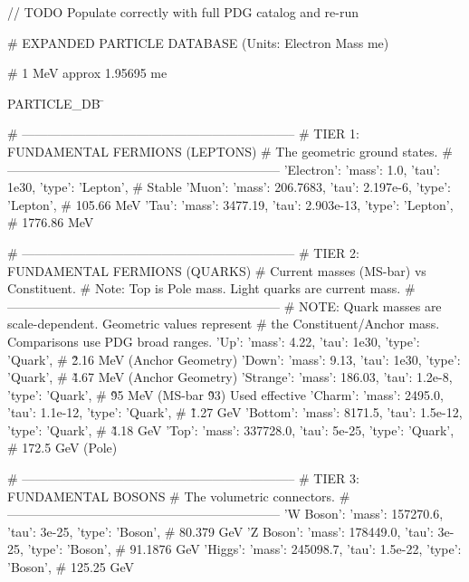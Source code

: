 // TODO Populate correctly with full PDG catalog and re-run

\# EXPANDED PARTICLE DATABASE (Units: Electron Mass me)

\# 1 MeV approx 1.95695 me

PARTICLE\_DB \= {  
    \# \------------------------------------------------------------------  
    \# TIER 1: FUNDAMENTAL FERMIONS (LEPTONS)  
    \# The geometric ground states.  
    \# \------------------------------------------------------------------  
    'Electron':    {'mass': 1.0,           'tau': 1e30,      'type': 'Lepton'},    \# Stable  
    'Muon':        {'mass': 206.7683,      'tau': 2.197e-6,  'type': 'Lepton'},    \# 105.66 MeV  
    'Tau':         {'mass': 3477.19,       'tau': 2.903e-13, 'type': 'Lepton'},    \# 1776.86 MeV

    \# \------------------------------------------------------------------  
    \# TIER 2: FUNDAMENTAL FERMIONS (QUARKS)  
    \# Current masses (MS-bar) vs Constituent.  
    \# Note: Top is Pole mass. Light quarks are current mass.  
    \# \------------------------------------------------------------------  
    \# NOTE: Quark masses are scale-dependent. Geometric values represent   
    \# the Constituent/Anchor mass. Comparisons use PDG broad ranges.  
    'Up':          {'mass': 4.22,          'tau': 1e30,      'type': 'Quark'},     \# \~2.16 MeV (Anchor Geometry)  
    'Down':        {'mass': 9.13,          'tau': 1e30,      'type': 'Quark'},     \# \~4.67 MeV (Anchor Geometry)  
    'Strange':     {'mass': 186.03,        'tau': 1.2e-8,    'type': 'Quark'},     \# \~95 MeV (MS-bar \~93) \- Used effective  
    'Charm':       {'mass': 2495.0,        'tau': 1.1e-12,   'type': 'Quark'},     \# \~1.27 GeV  
    'Bottom':      {'mass': 8171.5,        'tau': 1.5e-12,   'type': 'Quark'},     \# \~4.18 GeV  
    'Top':         {'mass': 337728.0,      'tau': 5e-25,     'type': 'Quark'},     \# 172.5 GeV (Pole)

    \# \------------------------------------------------------------------  
    \# TIER 3: FUNDAMENTAL BOSONS  
    \# The volumetric connectors.  
    \# \------------------------------------------------------------------  
    'W Boson':     {'mass': 157270.6,      'tau': 3e-25,     'type': 'Boson'},     \# 80.379 GeV  
    'Z Boson':     {'mass': 178449.0,      'tau': 3e-25,     'type': 'Boson'},     \# 91.1876 GeV  
    'Higgs':       {'mass': 245098.7,      'tau': 1.5e-22,   'type': 'Boson'},     \# 125.25 GeV

}
